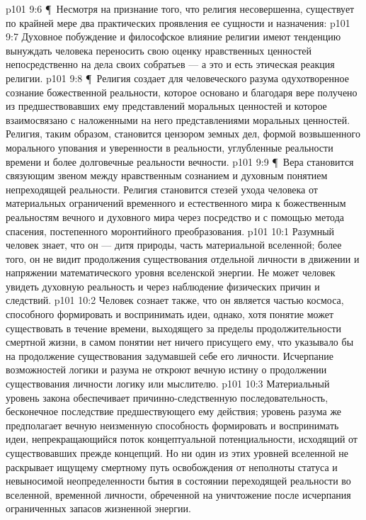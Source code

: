\vs p101 9:6 \P\ Несмотря на признание того, что религия несовершенна, существует по крайней мере два практических проявления ее сущности и назначения:
\vs p101 9:7 \bibnobreakspace Духовное побуждение и философское влияние религии имеют тенденцию вынуждать человека переносить свою оценку нравственных ценностей непосредственно на дела своих собратьев --- а это и есть этическая реакция религии.
\vs p101 9:8 \P\ \bibnobreakspace Религия создает для человеческого разума одухотворенное сознание божественной реальности, которое основано и благодаря вере получено из предшествовавших ему представлений моральных ценностей и которое взаимосвязано с наложенными на него представлениями моральных ценностей. Религия, таким образом, становится цензором земных дел, формой возвышенного морального упования и уверенности в реальности, углубленные реальности времени и более долговечные реальности вечности.
\vs p101 9:9 \P\ Вера становится связующим звеном между нравственным сознанием и духовным понятием непреходящей реальности. Религия становится стезей ухода человека от материальных ограничений временного и естественного мира к божественным реальностям вечного и духовного мира через посредство и с помощью метода спасения, постепенного моронтийного преобразования.
\vs p101 10:1 Разумный человек знает, что он --- дитя природы, часть материальной вселенной; более того, он не видит продолжения существования отдельной личности в движении и напряжении математического уровня вселенской энергии. Не может человек увидеть духовную реальность и через наблюдение физических причин и следствий.
\vs p101 10:2 Человек сознает также, что он является частью космоса, способного формировать и воспринимать идеи, однако, хотя понятие может существовать в течение времени, выходящего за пределы продолжительности смертной жизни, в самом понятии нет ничего присущего ему, что указывало бы на продолжение существования задумавшей себе его личности. Исчерпание возможностей логики и разума не откроют вечную истину о продолжении существования личности логику или мыслителю.
\vs p101 10:3 Материальный уровень закона обеспечивает причинно\hyp{}следственную последовательность, бесконечное последствие предшествующего ему действия; уровень разума же предполагает вечную неизменную способность формировать и воспринимать идеи, непрекращающийся поток концептуальной потенциальности, исходящий от существовавших прежде концепций. Но ни один из этих уровней вселенной не раскрывает ищущему смертному путь освобождения от неполноты статуса и невыносимой неопределенности бытия в состоянии переходящей реальности во вселенной, временной личности, обреченной на уничтожение после исчерпания ограниченных запасов жизненной энергии.
